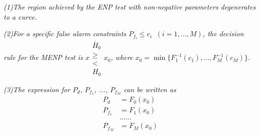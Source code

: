   \textit{(1)The region achieved by the ENP test with non-negative parameters degenerates to a curve.}

  \textit{(2)For a specific false alarm constraints $P_{f_i} \leq c_i\;\;(i = 1, ..., M)$, the decision rule for the MENP test is $x \substack{\bar{H}_0 \\ \geq \\ < \\H_0} x_0$, where $x_0 = \min\{F_1^{-1}(c_1), ..., F_M^{-1}(c_M)\}$.}

  \textit{(3)The expression for $P_d$, $P_{f_1}$, ..., $P_{f_M}$ can be written as}
  \begin{equation}
	\label{equ: chi pd}
	\begin{split}
	  P_d & = F_0(x_0)\\
	  P_{f_1} & = F_1(x_0)\\
	  &......\\
	  P_{f_M} & = F_M(x_0)
	\end{split}
  \end{equation}

